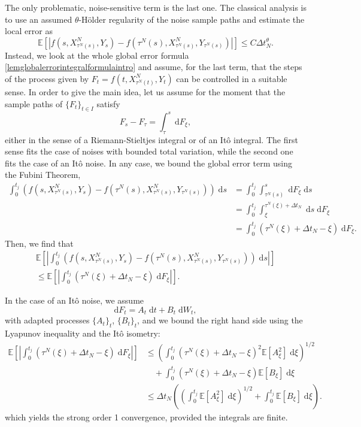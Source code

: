 \documentclass[reqno,12pt]{amsart}
\theoremstyle{plain}%
\theoremstyle{definition}
\begin{document}
The only problematic, noise-sensitive term is the last one. The classical analysis is to use an assumed $\theta$-H\"older regularity of the noise sample paths and estimate the local error as
\[
    \mathbb{E}\left[\left|f(s, X_{\tau^N(s)}^N, Y_s) - f(\tau^N(s), X_{\tau^N(s)}^N, Y_{\tau^N(s)})\right|\right] \leq C\Delta t_N^{\theta}.
\]
Instead, we look at the whole global error formula \eqref{lemglobalerrorintegralformulaintro} and assume, for the last term, that the steps of the process given by $F_t = f(t, X_{\tau^N(t)}^N, Y_t)$ can be controlled in a suitable sense. In order to give the main idea, let us assume for the moment that the sample paths of $\{F_t\}_{t\in I}$ satisfy
\[
    F_s - F_\tau = \int_\tau^s \;\mathrm{d}F_\xi,
\]
either in the sense of a Riemann-Stieltjes integral or of an It\^o integral. The first sense fits the case of noises with bounded total variation, while the second one fits the case of an It\^o noise. In any case, we bound the global error term using the Fubini Theorem,
\begin{align*}
    \int_0^{t_j} \left( f(s, X_{\tau^N(s)}^N, Y_s) - f(\tau^N(s), X_{\tau^N(s)}^N, Y_{\tau^N(s)}) \right)\;\mathrm{d}s & = \int_0^{t_j} \int_{\tau^N(s)}^s \;\mathrm{d}  F_\xi\;\mathrm{d}s \\
    & = \int_0^{t_j} \int_{\xi}^{\tau^N(\xi) + \Delta t_N} \;\mathrm{d}s \;\mathrm{d} F_\xi \\
    & = \int_0^{t_j} (\tau^N(\xi) + \Delta t_N - \xi) \;\mathrm{d} F_\xi.
\end{align*}
Then, we find that
\begin{multline*}
    \mathbb{E}\left[\left| \int_0^{t_j} \left( f(s, X_{\tau^N(s)}^N, Y_s) - f(\tau^N(s), X_{\tau^N(s)}^N, Y_{\tau^N(s)}) \right)\;\mathrm{d}s\right|\right] \\
    \leq \mathbb{E}\left[\left| \int_0^{t_j} (\tau^N(\xi) + \Delta t_N - \xi) \;\mathrm{d} F_\xi \right|\right].
\end{multline*}

In the case of an It\^o noise, we assume
\[
    \mathrm{d}F_t = A_t\;\mathrm{d}t + B_t\;\mathrm{d}W_t,
\]
with adapted processes $\{A_t\}_t$, $\{B_t\}_t$, and we bound the right hand side using the Lyapunov inequality and the It\^o isometry:
\begin{align*}
    \mathbb{E}\left[\left| \int_0^{t_j} (\tau^N(\xi) + \Delta t_N - \xi) \;\mathrm{d} F_\xi \right|\right] & \leq \left( \int_0^{t_j} (\tau^N(\xi) + \Delta t_N - \xi)^2 \mathbb{E}[A_\xi^2]\;\mathrm{d} \xi\right)^{1/2} \\ 
    & \quad + \int_0^{t_j} (\tau^N(\xi) + \Delta t_N - \xi) \mathbb{E}[B_\xi] \;\mathrm{d}\xi  \\ 
    & \leq \Delta t_N\left(\left( \int_0^{t_j} \mathbb{E}[A_\xi^2]\;\mathrm{d} \xi \right)^{1/2} + \int_0^{t_j} \mathbb{E}[B_\xi] \;\mathrm{d}\xi \right).
\end{align*}
which yields the strong order 1 convergence, provided the integrals are finite.
\end{document}

